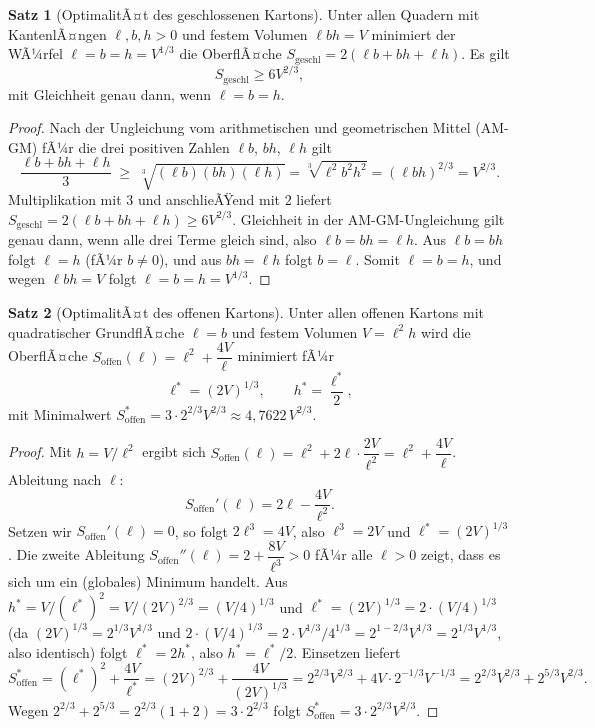 ﻿\documentclass[a4paper,12pt]{article}
\theoremstyle{definition}
\newtheorem{satz}{Satz}
\begin{document}
\begin{satz}[OptimalitÃ¤t des geschlossenen Kartons]
	\label{satz:wuerfel}
	Unter allen Quadern mit KantenlÃ¤ngen $\ell, b, h > 0$ und festem Volumen
	$\ell b h = V$ minimiert der WÃ¼rfel $\ell = b = h = V^{1/3}$ die OberflÃ¤che
	$S_{\mathrm{geschl}} = 2(\ell b + bh + \ell h)$. Es gilt
	\[
		S_{\mathrm{geschl}} \geq 6V^{2/3},
	\]
	mit Gleichheit genau dann, wenn $\ell = b = h$.
\end{satz}

\begin{proof}
	Nach der Ungleichung vom arithmetischen und geometrischen Mittel (AM-GM) fÃ¼r
	die drei positiven Zahlen $\ell b$, $b h$, $\ell h$ gilt
	\[
		\frac{\ell b + bh + \ell h}{3} \;\geq\; \sqrt[3]{(\ell b)(bh)(\ell h)}
		= \sqrt[3]{\ell^2 b^2 h^2} = (\ell b h)^{2/3} = V^{2/3}.
	\]
	Multiplikation mit $3$ und anschlieÃŸend mit $2$ liefert
	$S_{\mathrm{geschl}} = 2(\ell b + bh + \ell h) \geq 6V^{2/3}$. Gleichheit in
	der AM-GM-Ungleichung gilt genau dann, wenn alle drei Terme gleich sind, also
	$\ell b = bh = \ell h$. Aus $\ell b = bh$ folgt $\ell = h$ (fÃ¼r $b \neq 0$),
	und aus $bh = \ell h$ folgt $b = \ell$. Somit $\ell = b = h$, und wegen
	$\ell b h = V$ folgt $\ell = b = h = V^{1/3}$.
\end{proof}

\begin{satz}[OptimalitÃ¤t des offenen Kartons]
	\label{satz:offen}
	Unter allen offenen Kartons mit quadratischer GrundflÃ¤che $\ell = b$ und
	festem Volumen $V = \ell^2 h$ wird die OberflÃ¤che
	$S_{\mathrm{offen}}(\ell) = \ell^2 + \dfrac{4V}{\ell}$ minimiert fÃ¼r
	\[
		\ell^\ast = (2V)^{1/3}, \qquad h^\ast = \frac{\ell^\ast}{2},
	\]
	mit Minimalwert $S_{\mathrm{offen}}^\ast = 3 \cdot 2^{2/3} V^{2/3} \approx
	4{,}7622 \, V^{2/3}$.
\end{satz}

\begin{proof}
	Mit $h = V/\ell^2$ ergibt sich
	$S_{\mathrm{offen}}(\ell) = \ell^2 + 2\ell \cdot \dfrac{2V}{\ell^2} = \ell^2 +
	\dfrac{4V}{\ell}$. Ableitung nach $\ell$:
	\[
		S_{\mathrm{offen}}'(\ell) = 2\ell - \frac{4V}{\ell^2}.
	\]
	Setzen wir $S_{\mathrm{offen}}'(\ell) = 0$, so folgt $2\ell^3 = 4V$, also
	$\ell^3 = 2V$ und $\ell^\ast = (2V)^{1/3}$. Die zweite Ableitung
	$S_{\mathrm{offen}}''(\ell) = 2 + \dfrac{8V}{\ell^3} > 0$ fÃ¼r alle
	$\ell > 0$ zeigt, dass es sich um ein (globales) Minimum handelt. Aus
	$h^\ast = V/(\ell^\ast)^2 = V/(2V)^{2/3} = (V/4)^{1/3}$ und
	$\ell^\ast = (2V)^{1/3} = 2 \cdot (V/4)^{1/3}$ (da
	$(2V)^{1/3} = 2^{1/3}V^{1/3}$ und $2 \cdot (V/4)^{1/3} = 2 \cdot
	V^{1/3}/4^{1/3} = 2^{1-2/3}V^{1/3} = 2^{1/3}V^{1/3}$, also identisch) folgt
	$\ell^\ast = 2h^\ast$, also $h^\ast = \ell^\ast/2$. Einsetzen liefert
	\[
		S_{\mathrm{offen}}^\ast = (\ell^\ast)^2 + \frac{4V}{\ell^\ast}
		= (2V)^{2/3} + \frac{4V}{(2V)^{1/3}}
		= 2^{2/3}V^{2/3} + 4V \cdot 2^{-1/3}V^{-1/3}
		= 2^{2/3}V^{2/3} + 2^{5/3}V^{2/3}.
	\]
	Wegen $2^{2/3} + 2^{5/3} = 2^{2/3}(1 + 2) = 3 \cdot 2^{2/3}$ folgt
	$S_{\mathrm{offen}}^\ast = 3 \cdot 2^{2/3}V^{2/3}$.
\end{proof}
\end{document}
